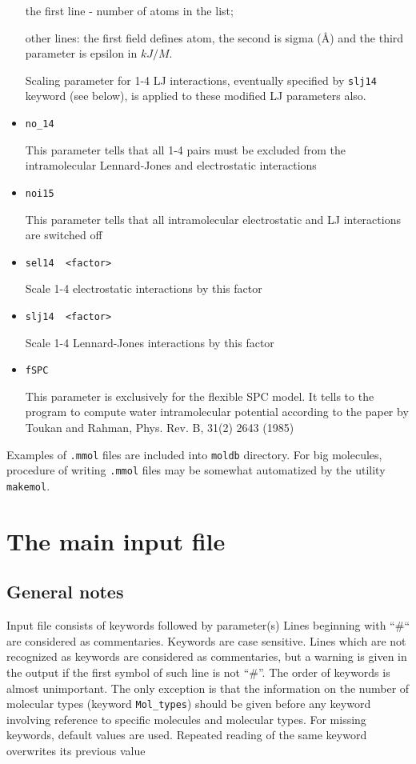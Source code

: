 \documentclass{article}
\begin{document}
\begin{itemize}
the first line - number of atoms in the list;

other lines: the first field defines atom, the second is sigma (\AA) 
and the third parameter is epsilon in $kJ/M$.

Scaling parameter for 1-4 LJ interactions, eventually specified by 
\verb|slj14| keyword (see below), is applied to these modified LJ parameters
also.

\item
\verb|no_14|

This parameter tells that all 1-4 pairs must be excluded 
from the intramolecular Lennard-Jones and electrostatic interactions

\item
\verb|noi15|

This parameter tells that all intramolecular electrostatic and LJ
interactions are switched off

\item
\verb|sel14  <factor>|

Scale 1-4 electrostatic interactions by this factor

\item
\verb|slj14  <factor>|

Scale 1-4 Lennard-Jones interactions by this factor

\item
\verb|fSPC|

This parameter is exclusively for the flexible SPC model. It tells to the 
program to compute water intramolecular potential according to the paper 
by Toukan and Rahman,  Phys. Rev. B, 31(2) 2643 (1985)

\end{itemize}

Examples of \verb|.mmol| files are included into \verb|moldb| directory.
For big molecules, procedure of writing \verb|.mmol| files may be
somewhat automatized by the utility \verb|makemol|.

\section{The main input file}

\subsection{General notes}
Input file consists of keywords followed by parameter(s)
Lines beginning with ``\#`` are considered as commentaries.
Keywords are case sensitive.
Lines which are not recognized as keywords are considered as commentaries,
but a warning is given in the output if the first symbol of such line is not 
``\#''.  The order of keywords is almost unimportant. The only exception is
that the information on the number of molecular types 
(keyword \verb|Mol_types|) should be given before any keyword involving 
reference to specific molecules and molecular types. For missing keywords, 
default values are used.
Repeated reading of the same keyword overwrites its previous value
\end{document}
